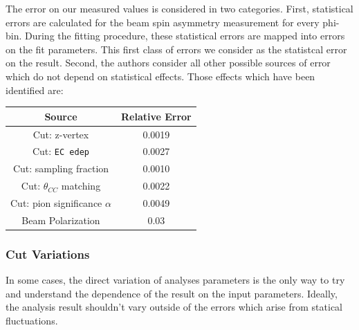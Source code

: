 
The error on our measured values is considered in two categories.  First, statistical errors are calculated for the beam spin asymmetry measurement for every phi-bin.  During the fitting procedure, these statistical errors are mapped into errors on the fit parameters.  This first class of errors we consider as the statistcal error on the result.  Second, the authors consider all other possible sources of error which do not depend on statistical effects.  Those effects which have been identified are: \\


\begin{center}
\begin{tabular}{ | c || c |  }
 \hline
 Source & Relative Error\\
 \hline
 Cut: z-vertex                   & 0.0019\\
 Cut: \texttt{EC edep}           & 0.0027\\
 Cut: sampling fraction          & 0.0010\\
 Cut: $\theta_{CC}$ matching     & 0.0022\\
 Cut: pion significance $\alpha$ & 0.0049\\
 Beam Polarization               & 0.03  \\
 \hline
\end{tabular}
\end{center}

\subsubsection{Cut Variations}
In some cases, the direct variation of analyses parameters is the only way to try and understand the dependence of the result on the input parameters.  Ideally, the analysis result shouldn't vary outside of the errors which arise from statical fluctuations.    


